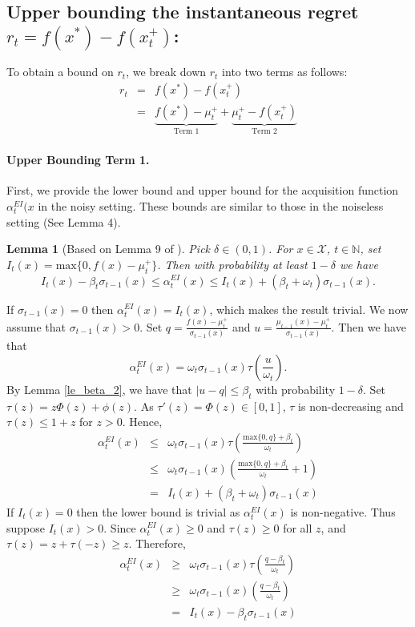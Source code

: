 \documentclass[twoside]{article}
\newtheorem{lemma}{Lemma}
\newenvironment{proof*}[1][\proofname]{
  \renewcommand\qedsymbol{\rule{2.5mm}{2.5mm}}
  \begin{proof}[#1]}{\end{proof}}
\begin{document}
\subsection{Upper bounding the instantaneous regret $r_t = f(x^*) - f(x_t^+)$:} To obtain a bound on $r_t$, we break down $r_t$ into two terms as follows:
\begin{eqnarray*}
r_t & = & f(x^*) - f(x_t^+) \\
& = &  \underbrace{f(x^*) - \mu^+_{t}}_{\text{Term 1}} + \underbrace{\mu_{t}^+ - f(x_t^+)}_{\text{Term 2}}
\end{eqnarray*}
\paragraph{Upper Bounding Term 1.}
First, we provide the lower bound and upper bound for the acquisition function $\alpha^{EI}_t(x$ in the noisy setting. These bounds are similar to those in the noiseless setting (See Lemma 4).
\begin{lemma}[Based on Lemma 9 of \citep{wang2014}]
Pick $\delta \in (0,1)$. For $x \in \mathcal X$, $t \in \mathbb{N}$, set $I_t(x) = \text{max}\{0, f(x)- \mu^+_t\}$. Then with  probability at least $1 -\delta$ we have
$$I_t(x) - \beta_t\sigma_{t-1}(x) \le \alpha^{EI}_t(x) \le I_t(x) + (\beta_t + \omega_t)\sigma_{t-1}(x).$$ \label{lem2.1}
\end{lemma}
\begin{proof*}
If $\sigma_{t-1}(x) = 0$ then $\alpha_t^{EI}(x) = I_t(x)$, which makes the result trivial. We now assume that $\sigma_{t-1}(x) > 0$. Set $q = \frac{f(x) - \mu^+_t}{\sigma_{t-1}(x)}$ and $u = \frac{\mu_{t-1}(x) - \mu^+_{t}}{\sigma_{t-1}(x)}$. Then we have that
$$\alpha_t^{EI}(x) = \omega_t \sigma_{t-1}(x) \tau(\frac{u}{\omega_t}).$$
By Lemma \ref{le_beta_2}, we have that $|u - q| \le \beta_t$ with probability $1 -\delta$. Set $\tau(z) = z\Phi(z) + \phi(z)$. As $\tau'(z) = \Phi(z) \in [0,1]$, $\tau$ is non-decreasing and $\tau(z) \le 1 + z$ for $z > 0$. Hence,
\begin{eqnarray*}
\alpha_t^{EI}(x) & \le & \omega_t\sigma_{t-1}(x)\tau(\frac{\text{max}\{0, q\} + \beta_t}{\omega_t}) \\
& \le & \omega_t \sigma_{t-1}(x)(\frac{\text{max}\{0, q\} + \beta_t}{\omega_t} + 1) \\
& = & I_t(x) + (\beta_t + \omega_t) \sigma_{t-1}(x)
\end{eqnarray*}
If $I_t(x) = 0$ then the lower bound is trivial as $\alpha_t^{EI}(x)$ is non-negative. Thus suppose $I_t(x) > 0$. Since $\alpha_t^{EI}(x) \ge 0$ and $\tau(z) \ge 0$ for all $z$, and $\tau(z) = z + \tau(-z) \ge z$. Therefore,
\begin{eqnarray*}
\alpha_t^{EI}(x) & \ge & \omega_t\sigma_{t-1}(x)\tau(\frac{q -\beta_t}{\omega_t}) \\
& \ge & \omega_t \sigma_{t-1}(x)(\frac{q -\beta_t}{\omega_t}) \\
& = & I_t(x) -  \beta_t \sigma_{t-1}(x)
\end{eqnarray*}
\qedhere
\end{proof*}
\end{document}
